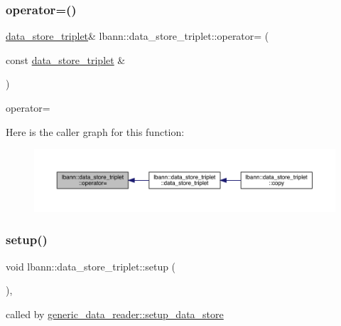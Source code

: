 \subsubsection{\texorpdfstring{operator=()}{operator=()}}
{\footnotesize\ttfamily \hyperlink{classlbann_1_1data__store__triplet}{data\+\_\+store\+\_\+triplet}\& lbann\+::data\+\_\+store\+\_\+triplet\+::operator= (\begin{DoxyParamCaption}\item[{const \hyperlink{classlbann_1_1data__store__triplet}{data\+\_\+store\+\_\+triplet} \&}]{ }\end{DoxyParamCaption})\hspace{0.3cm}{\ttfamily [default]}}



operator= 

Here is the caller graph for this function\+:\nopagebreak
\begin{figure}[H]
\begin{center}
\leavevmode
\includegraphics[width=350pt]{classlbann_1_1data__store__triplet_a0ed814d64a7b664ef9646186c4642098_icgraph}
\end{center}
\end{figure}
\mbox{\label{classlbann_1_1data__store__triplet_aca66b9cf71d7ba2b9870e76c5b92b5e8}} 
\subsubsection{\texorpdfstring{setup()}{setup()}}
{\footnotesize\ttfamily void lbann\+::data\+\_\+store\+\_\+triplet\+::setup (\begin{DoxyParamCaption}{ }\end{DoxyParamCaption})\hspace{0.3cm}{\ttfamily [override]}, {\ttfamily [virtual]}}



called by \hyperlink{classlbann_1_1generic__data__reader_a8b2a09d38512fc11f1b9d572c89100a7}{generic\+\_\+data\+\_\+reader\+::setup\+\_\+data\+\_\+store} 



